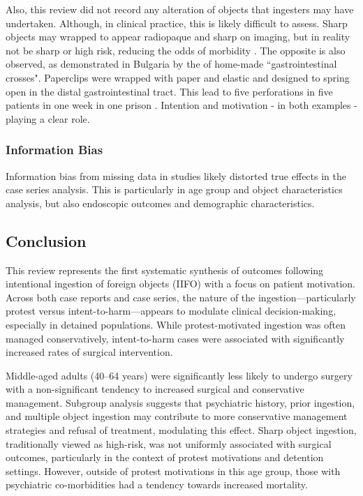 Also, this review did not record any alteration of objects that ingesters may have undertaken. Although, in clinical practice, this is likely difficult to assess. Sharp objects may wrapped to appear radiopaque and sharp on imaging, but in reality not be sharp or high risk, reducing the odds of morbidity \cite{Ataya_2013,Albeldawi_2014}. The opposite is also observed, as demonstrated in Bulgaria by the of home-made ``gastrointestinal crosses". Paperclips were wrapped with paper and elastic and designed to spring open in the distal gastrointestinal tract. This lead to five perforations in five patients in one week in one prison \cite{Losanoff_1996}. Intention and motivation - in both examples - playing a clear role.

\subsubsection{Information Bias}
Information bias from missing data in studies likely distorted true effects in the case series analysis. This is particularly in age group and object characteristics analysis, but also endoscopic outcomes and demographic characteristics.  


\subsection{Conclusion}

\noindent This review represents the first systematic synthesis of outcomes following intentional ingestion of foreign objects (IIFO) with a focus on patient motivation. Across both case reports and case series, the nature of the ingestion—particularly protest versus intent-to-harm—appears to modulate clinical decision-making, especially in detained populations. While protest-motivated ingestion was often managed conservatively, intent-to-harm cases were associated with significantly increased rates of surgical intervention. 

Middle-aged adults (40--64 years) were significantly less likely to undergo surgery with a non-significant tendency to increased surgical and conservative management. Subgroup analysis suggests that psychiatric history, prior ingestion, and multiple object ingestion may contribute to more conservative management strategies and refusal of treatment, modulating this effect. Sharp object ingestion, traditionally viewed as high-risk, was not uniformly associated with surgical outcomes, particularly in the context of protest motivations and detention settings. However, outside of protest motivations in this age group, those with psychiatric co-morbidities had a tendency towards increased mortality.

